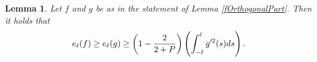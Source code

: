 \documentclass{amsart}
\newtheorem{lemma}{Lemma}
\begin{document}

\begin{lemma} \label{UnweightedPoincare}
 Let $f$ and $g$ be as in the statement of Lemma \ref{fOrthogonalPart}. Then it holds that 
 \begin{align} \notag
 e_\ell(f)  \geq e_\ell (g) \geq \left( 1 - \frac{2}{2 + P}\right)\left( \int_{- \ell}^{\ell} g'^2(s) ds  \right).
\end{align}
\end{lemma}
\end{document}
